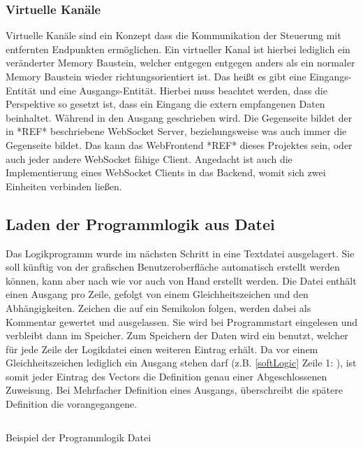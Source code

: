 \subsubsection{Virtuelle Kanäle}\label{kap:ums:virtualchannel}
Virtuelle Kanäle sind ein Konzept dass die Kommunikation der Steuerung mit entfernten Endpunkten ermöglichen. Ein virtueller Kanal ist hierbei lediglich ein veränderter Memory Baustein, welcher entgegen entgegen anders als ein normaler Memory Baustein wieder richtungsorientiert ist. Das heißt es gibt eine Eingangs-Entität und eine Ausgangs-Entität. Hierbei muss beachtet werden, dass die Perspektive so gesetzt ist, dass ein Eingang die extern empfangenen Daten beinhaltet. Während in den Ausgang geschrieben wird. Die Gegenseite bildet der in *REF* beschriebene WebSocket Server, beziehungsweise was auch immer die Gegenseite bildet. Das kann das WebFrontend *REF* dieses Projektes sein, oder auch jeder andere WebSocket fähige Client. Angedacht ist auch die Implementierung eines WebSocket Clients in das Backend, womit sich zwei Einheiten verbinden ließen. 


\subsection{Laden der Programmlogik aus Datei}\label{kap:ums:logicOutsource}
Das Logikprogramm wurde im nächsten Schritt in eine Textdatei ausgelagert. Sie soll künftig von der grafischen Benutzeroberfläche automatisch erstellt werden können, kann aber nach wie vor auch von Hand erstellt werden. Die Datei enthält einen Ausgang pro Zeile, gefolgt von einem Gleichheitszeichen und den Abhängigkeiten. Zeichen die auf ein Semikolon folgen, werden dabei als Kommentar gewertet und ausgelassen. Sie wird bei Programmstart eingelesen und verbleibt dann im Speicher. Zum Speichern der Daten wird ein  benutzt, welcher für jede Zeile der Logikdatei einen weiteren Eintrag erhält. Da vor einem Gleichheitszeichen lediglich ein Ausgang stehen darf (z.B. \ref{softLogic} Zeile 1: ), ist somit jeder Eintrag des Vectors die Definition genau einer Abgeschlossenen Zuweisung. Bei Mehrfacher Definition eines Ausgangs, überschreibt die spätere Definition die vorangegangene. 

\begin{listing}[H]
	\inputminted[numbersep=1pt,fontsize=\scriptsize,frame=single, firstline=29,lastline=36]{c}{./code/logic.conf}
	\caption{Beispiel der Programmlogik Datei}
	\label{code:softLogic}
\end{listing}


